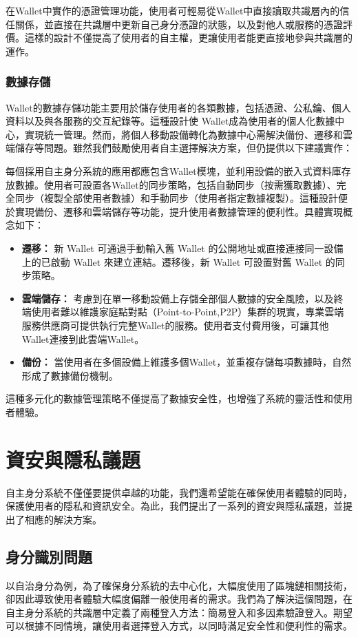 在Wallet中實作的憑證管理功能，使用者可輕易從Wallet中直接讀取共識層內的信任關係，並直接在共識層中更新自己身分憑證的狀態，以及對他人或服務的憑證評價。這樣的設計不僅提高了使用者的自主權，更讓使用者能更直接地參與共識層的運作。
\subsubsection{數據存儲}
Wallet的數據存儲功能主要用於儲存使用者的各類數據，包括憑證、公私鑰、個人資料以及與各服務的交互紀錄等。這種設計使 Wallet成為使用者的個人化數據中心，實現統一管理。然而，將個人移動設備轉化為數據中心需解決備份、遷移和雲端儲存等問題。雖然我們鼓勵使用者自主選擇解決方案，但仍提供以下建議實作：

每個採用自主身分系統的應用都應包含Wallet模塊，並利用設備的嵌入式資料庫存放數據。使用者可設置各Wallet的同步策略，包括自動同步（按需獲取數據）、完全同步（複製全部使用者數據）和手動同步（使用者指定數據複製）。這種設計便於實現備份、遷移和雲端儲存等功能，提升使用者數據管理的便利性。具體實現概念如下：
\begin{itemize}
  \item \textbf{遷移：} 新 Wallet 可通過手動輸入舊 Wallet 的公開地址或直接連接同一設備上的已啟動 Wallet 來建立連結。遷移後，新 Wallet 可設置對舊 Wallet 的同步策略。
  \item \textbf{雲端儲存：} 考慮到在單一移動設備上存儲全部個人數據的安全風險，以及終端使用者難以維護家庭點對點（Point-to-Point,P2P）集群的現實，專業雲端服務供應商可提供執行完整Wallet的服務。使用者支付費用後，可讓其他 Wallet連接到此雲端Wallet。
  \item \textbf{備份：} 當使用者在多個設備上維護多個Wallet，並重複存儲每項數據時，自然形成了數據備份機制。
\end{itemize}
這種多元化的數據管理策略不僅提高了數據安全性，也增強了系統的靈活性和使用者體驗。
\section{資安與隱私議題}
自主身分系統不僅僅要提供卓越的功能，我們還希望能在確保使用者體驗的同時，保護使用者的隱私和資訊安全。為此，我們提出了一系列的資安與隱私議題，並提出了相應的解決方案。
\subsection{身分識別問題}
以自治身分為例，為了確保身分系統的去中心化，大幅度使用了區塊鏈相關技術，卻因此導致使用者體驗大幅度偏離一般使用者的需求。我們為了解決這個問題，在自主身分系統的共識層中定義了兩種登入方法：簡易登入和多因素驗證登入。期望可以根據不同情境，讓使用者選擇登入方式，以同時滿足安全性和便利性的需求。

